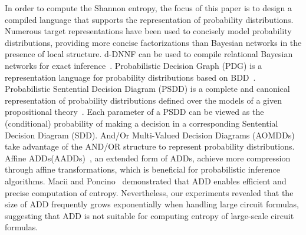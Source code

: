 \begin{comment}
	Later, Darwiche et al. proposed the method of knowledge compilation, which sparked a wave of computing model counting through knowledge compilation, giving birth to many well-known solvers such as c2d~\cite{darwiche2004new}, dsharp~\cite{muise2012d}, d4~\cite{lagniez2017improved}, ExactMC~\cite{lai2021power}, etc.
\end{comment}

In order to compute the Shannon entropy, the focus of this paper is to design a compiled language that supports the representation of probability distributions.
Numerous target representations have been used to concisely model probability distributions, providing more concise factorizations than Bayesian networks in the presence of local structure\cite{dal2021compositional}.
d-DNNF can be used to compile relational Bayesian networks for exact inference~\cite{chavira2006compiling}.
Probabilistic Decision Graph (PDG) is a representation language for probability distributions based on BDD~\cite{jaeger2004probabilistic}.
Probabilistic Sentential Decision Diagram (PSDD) is a complete and canonical representation of probability distributions defined over the models of a given propositional theory~\cite{kisa2014probabilistic}. 
Each parameter of a PSDD can be viewed as the (conditional) probability of making a decision in a corresponding Sentential Decision Diagram (SDD).
And/Or Multi-Valued Decision Diagrams (AOMDDs)~\cite{mateescu2008and} take advantage of the AND/OR structure to represent probability distributions.
Affine ADDs(AADDs)~\cite{sanner2005affine}, an extended form of ADDs, achieve more compression through affine transformations, which is beneficial for probabilistic inference algorithms.
Macii and Poncino~\cite{macii1996exact} demonstrated that ADD enables efficient and precise computation of entropy.
Nevertheless, our experiments revealed that the size of ADD frequently grows exponentially when handling large circuit formulas, suggesting that ADD is not suitable for computing entropy of large-scale circuit formulas.
